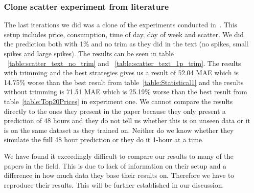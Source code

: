\subsubsection{Clone scatter experiment from literature}
The last iterations we did was a clone of the experiments conducted in~\cite{singhal2011electricity}. This setup includes price, consumption, time of day, day of week and scatter. We did the prediction both with 1\% and no trim as they did in the text (no spikes, small spikes and large spikes). The results can be seen in table ~\ref{table:scatter_text_no_trim} and ~\ref{table:scatter_text_1p_trim}. The results with trimming and the best strategies gives us a result of 52.04 MAE which is 14.75\% worse than the best result from table~\ref{table:Statistical1} and the results without trimming is 71.51 MAE which is 25.19\% worse than the best result from table~\ref{table:Top20Prices} in experiment one. We cannot compare the results directly to the ones they present in the paper because they only present a prediction of 48 hours and they do not tell us whether this is on unseen data or it is on the same dataset as they trained on. Neither do we know whether they simulate the full 48 hour prediction or they do it 1-hour at a time.

We have found it exceedingly difficult to compare our results to many of the papers in the field\cite{singhal2011electricity,yamin2004adaptive}. This is due to lack of information on their setup and a difference in how much data they base their results on. Therefore we have to reproduce their results. This will be further established in our discussion.

